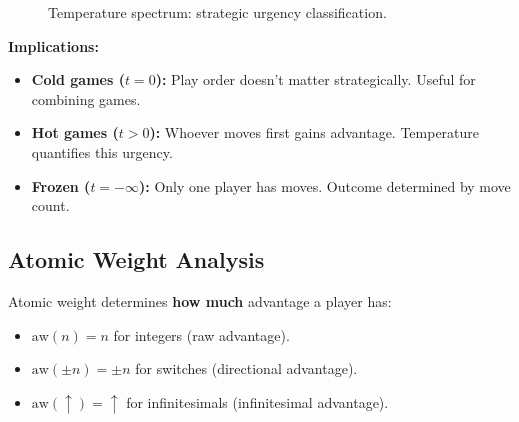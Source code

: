 \documentclass[10pt,a4paper,twocolumn]{article}
\theoremstyle{plain}
\theoremstyle{definition}
\theoremstyle{remark}
\begin{document}
\begin{figure}[h!]
\centering
{}
\caption{Temperature spectrum: strategic urgency classification.}
\end{figure}

\textbf{Implications:}

\begin{itemize}
\item \textbf{Cold games ($t=0$):} Play order doesn't matter strategically. Useful for combining games.
\item \textbf{Hot games ($t>0$):} Whoever moves first gains advantage. Temperature quantifies this urgency.
\item \textbf{Frozen ($t=-\infty$):} Only one player has moves. Outcome determined by move count.
\end{itemize}

\subsection{Atomic Weight Analysis}

Atomic weight determines \textbf{how much} advantage a player has:
\begin{itemize}
\item $\text{aw}(n) = n$ for integers (raw advantage).
\item $\text{aw}(\pm n) = \pm n$ for switches (directional advantage).
\item $\text{aw}(\uparrow) = \uparrow$ for infinitesimals (infinitesimal advantage).
\end{itemize}
\end{document}
